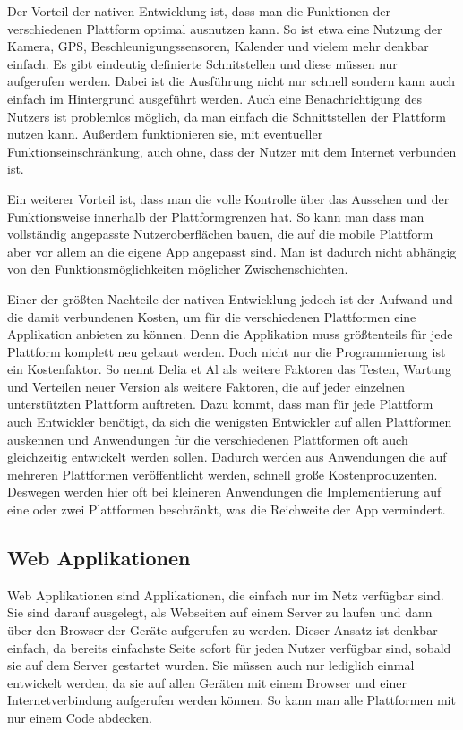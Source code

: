 Der Vorteil der nativen Entwicklung ist, dass man die Funktionen der verschiedenen Plattform optimal ausnutzen kann. So ist etwa eine Nutzung der Kamera, GPS, Beschleunigungssensoren, Kalender und vielem mehr denkbar einfach. Es gibt eindeutig definierte Schnitstellen und diese müssen nur aufgerufen werden. Dabei ist die Ausführung nicht nur schnell sondern kann auch einfach im Hintergrund ausgeführt werden. Auch eine Benachrichtigung des Nutzers ist problemlos möglich, da man einfach die Schnittstellen der Plattform nutzen kann. Außerdem funktionieren sie, mit eventueller Funktionseinschränkung, auch ohne, dass der Nutzer mit dem Internet verbunden ist. \cite{IEEE_development_classes}

Ein weiterer Vorteil ist, dass man die volle Kontrolle über das Aussehen und der Funktionsweise innerhalb der Plattformgrenzen hat. So kann man dass man vollständig angepasste Nutzeroberflächen bauen, die auf die mobile Plattform aber vor allem an die eigene App angepasst sind. Man ist dadurch nicht abhängig von den Funktionsmöglichkeiten möglicher Zwischenschichten.

Einer der größten Nachteile der nativen Entwicklung jedoch ist der Aufwand und die damit verbundenen Kosten, um für die verschiedenen Plattformen eine Applikation anbieten zu können. Denn die Applikation muss größtenteils für jede Plattform komplett neu gebaut werden. Doch nicht nur die Programmierung ist ein Kostenfaktor. So nennt Delia et Al als weitere Faktoren das Testen, Wartung und Verteilen neuer Version als weitere Faktoren, die auf jeder einzelnen unterstützten Plattform auftreten.\cite{IEEE_development_classes} Dazu kommt, dass man für jede Plattform auch Entwickler benötigt, da sich die wenigsten Entwickler auf allen Plattformen auskennen und Anwendungen für die verschiedenen Plattformen oft auch gleichzeitig entwickelt werden sollen. Dadurch werden aus Anwendungen die auf mehreren Plattformen veröffentlicht werden, schnell große Kostenproduzenten. Deswegen werden hier oft bei kleineren Anwendungen die Implementierung auf eine oder zwei Plattformen beschränkt, was die Reichweite der App vermindert.

\subsection{Web Applikationen}
Web Applikationen sind Applikationen, die einfach nur im Netz verfügbar sind. Sie sind darauf ausgelegt, als Webseiten auf einem Server zu laufen und dann über den Browser der Geräte aufgerufen zu werden. Dieser Ansatz ist denkbar einfach, da bereits einfachste Seite sofort für jeden Nutzer verfügbar sind, sobald sie auf dem Server gestartet wurden. Sie müssen auch nur lediglich einmal entwickelt werden, da sie auf allen Geräten mit einem Browser und einer Internetverbindung aufgerufen werden können. So kann man alle Plattformen mit nur einem Code abdecken.\cite{IEEE_development_classes}

